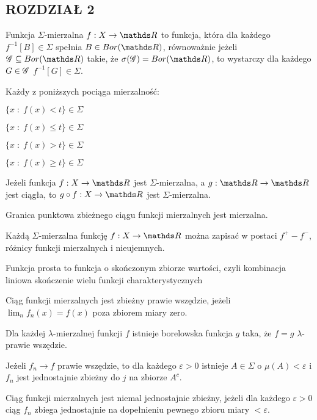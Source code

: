 \documentclass{article}[13pt]
\newcommand{\bor}{Bor(\R)}
\begin{document}
\subsection*{ROZDZIAŁ 2}

\begin{multicols}{2}
    {\color{def}Funkcja $\Sigma$-mierzalna} $f:X\to\R$ to funkcja, która dla każdego $f^{-1}[B]\in\Sigma$ spełnia $B\in\bor$, równoważnie jeżeli $\rodz{G}\subseteq\bor$ takie, że $\sigma(\rodz{G})=\bor$, to wystarczy dla każdego $G\in\mathcal{G}$ $f^{-1}[G]\in\Sigma$.
    \medskip

    Każdy z poniższych pociąga mierzalność:
    \smallskip

    $\{x\;:\;f(x)<t\}\in\Sigma$

    $\{x\;:\;f(x)\leq t\}\in\Sigma$

    $\{x\;:\;f(x)>t\}\in\Sigma$

    $\{x\;:\;f(x)\geq t\}\in \Sigma$
    \medskip

    Jeżeli funkcja $f:X\to\R$ jest $\Sigma$-mierzalna, a $g:\R\to\R$ jest ciągła, to $g\circ f:X\to\R$ jest $\Sigma$-mierzalna.
    \medskip

    {\color{acc}Granica punktowa} zbieżnego ciągu funkcji mierzalnych jest mierzalna.
    \medskip

    Każdą $\Sigma$-mierzalna funkcję $f:X\to\R$ można zapisać w postaci $f^+-f^-$, różnicy funkcji mierzalnych i nieujemnych.
    \medskip

    \medskip

    {\color{def}Funkcja prosta} to funkcja o skończonym zbiorze wartości, czyli kombinacja liniowa skończenie wielu {\color{acc}funkcji charakterystycznych}
    \medskip

    Ciąg funkcji mierzalnych jest {\color{def}zbieżny prawie wszędzie}, jeżeli $\lim_nf_n(x)=f(x)$ poza zbiorem miary zero.
    \medskip

    Dla każdej $\lambda$-mierzalnej funkcji $f$ istnieje borelowska funkcja $g$ taka, że $f=g$ $\lambda$-prawie wszędzie.
    \medskip

    Jeżeli $f_n\to f$ prawie wszędzie, to dla każdego $\varepsilon>0$ istnieje $A\in\Sigma$ o $\mu(A)<\varepsilon$ i $f_n$ jest jednostajnie zbieżny do $j$ na zbiorze $A^c$.
    \medskip

    Ciąg funkcji mierzalnych jest {\color{def}niemal jednostajnie zbieżny}, jeżeli dla każdego $\varepsilon>0$ ciąg $f_n$ zbiega jednostajnie na dopełnieniu pewnego zbioru miary $<\varepsilon$.
    \medskip


\end{multicols}
\end{document}
